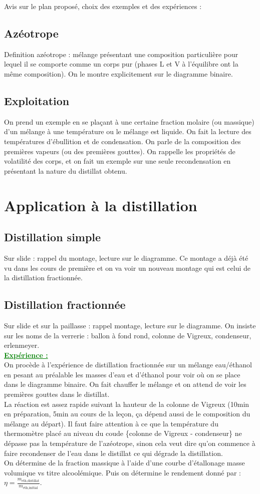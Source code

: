 \begin{reportBlock}{Avis sur le plan proposé, choix des exemples et des expériences : }
\subsection{Azéotrope}
Definition azéotrope : mélange présentant une composition particulière pour lequel il se comporte comme un corps pur (phases L et V à l'équilibre ont la même composition). On le montre explicitement sur le diagramme binaire.
\subsection{Exploitation}
On prend un exemple en se plaçant à une certaine fraction molaire (ou massique) d'un mélange à une température ou le mélange est liquide. On fait la lecture des températures d'ébullition et de condensation. On parle de la composition des premières vapeurs (ou des premières gouttes). On rappelle les propriétés de volatilité des corps, et on fait un exemple sur une seule recondensation en présentant la nature du distillat obtenu.
\section{Application à la distillation}
\subsection{Distillation simple}
Sur slide : rappel du montage, lecture sur le diagramme. Ce montage a déjà été vu dans les cours de première et on va voir un nouveau montage qui est celui de la distillation fractionnée.
\subsection{Distillation fractionnée}
Sur slide et sur la paillasse : rappel montage, lecture sur le diagramme. On insiste sur les noms de la verrerie : ballon à fond rond, colonne de Vigreux, condenseur, erlenmeyer.\\

\textcolor{green}{\textbf{\underline{Expérience :}}}\\


On procède à l'expérience de distillation fractionnée sur un mélange eau/éthanol en pesant au préalable les masses d'eau et d'éthanol pour voir où on se place dans le diagramme binaire. On fait chauffer le mélange et on attend de voir les premières gouttes dans le distillat.\\
La réaction est assez rapide suivant la hauteur de la colonne de Vigreux (10min en préparation, 5min au cours de la leçon, ça dépend aussi de le composition du mélange au départ). Il faut faire attention à ce que la température du thermomètre placé au niveau du coude \{colonne de Vigreux - condenseur\} ne dépasse pas la température de l'azéotrope, sinon cela veut dire qu'on commence à faire recondenser de l'eau dans le distillat ce qui dégrade la distillation.\\
On détermine de la fraction massique à l'aide d'une courbe d'étallonage masse volumique vs titre alcoolémique. Puis on détermine le rendement donné par : $\eta=\frac{m_{\text{eth,distillat}}}{m_{\text{eth,initial}}}$.

\end{reportBlock}
